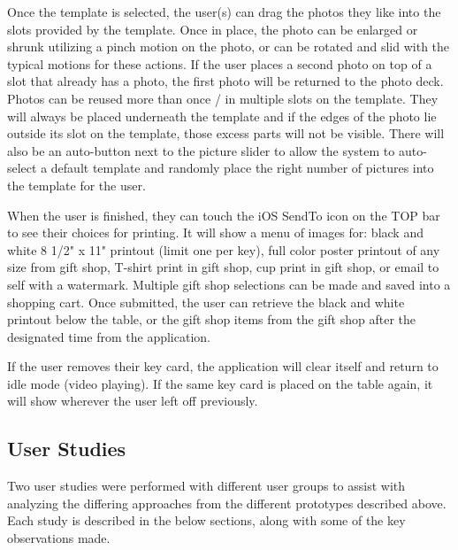 \documentclass{tei2013}
\begin{document}
Once the template is selected, the user(s) can drag the photos they like into the slots provided by the template.  Once in place, the photo can be enlarged or shrunk utilizing a pinch motion on the photo, or can be rotated and slid with the typical motions for these actions.  If the user places a second photo on top of a slot that already has a photo, the first photo will be returned to the photo deck.  Photos can be reused more than once / in multiple slots on the template.  They will always be placed underneath the template and if the edges of the photo lie outside its slot on the template, those excess parts will not be visible.  There will also be an auto-button next to the picture slider to allow the system to auto-select a default template and randomly place the right number of pictures into the template for the user.

When the user is finished, they can touch the iOS SendTo icon on the TOP bar to see their choices for printing.  It will show a menu of images for: black and white 8 1/2" x 11" printout (limit one per key), full color poster printout of any size from gift shop, T-shirt print in gift shop, cup print in gift shop, or email to self with a watermark.  Multiple gift shop selections can be made and saved into a shopping cart.  Once submitted, the user can retrieve the black and white printout below the table, or the gift shop items from the gift shop after the designated time from the application.  

If the user removes their key card, the application will clear itself and return to idle mode (video playing).  If the same key card is placed on the table again, it will show wherever the user left off previously.\\


\subsection{User Studies}
Two user studies were performed with different user groups to assist with analyzing the differing approaches from the different prototypes described above.  Each study is described in the below sections, along with some of the key observations made.

\end{document}

